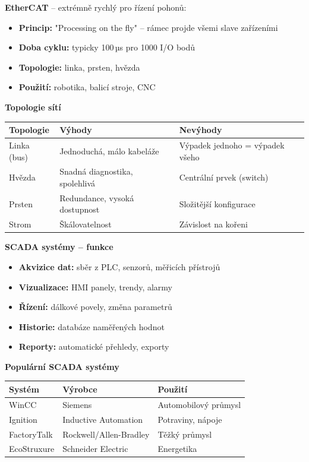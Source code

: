 \documentclass[a4paper,10pt]{article}
\begin{document}
\begin{vysvetlenibox}
\textbf{EtherCAT} -- extrémně rychlý pro řízení pohonů:
\begin{itemize}[noitemsep, leftmargin=1.4em, topsep=4pt]
    \item \textbf{Princip:} "Processing on the fly" -- rámec projde všemi slave zařízeními
    \item \textbf{Doba cyklu:} typicky 100\,µs pro 1000 I/O bodů
    \item \textbf{Topologie:} linka, prsten, hvězda
    \item \textbf{Použití:} robotika, balicí stroje, CNC
\end{itemize}

\textbf{Topologie sítí}
\begin{center}
\begin{tabularx}{0.95\linewidth}{@{} l X X @{}}
    \toprule
    \textbf{Topologie} & \textbf{Výhody} & \textbf{Nevýhody} \\
    \midrule
    Linka (bus) & Jednoduchá, málo kabeláže & Výpadek jednoho = výpadek všeho \\
    Hvězda & Snadná diagnostika, spolehlivá & Centrální prvek (switch) \\
    Prsten & Redundance, vysoká dostupnost & Složitější konfigurace \\
    Strom & Škálovatelnost & Závislost na kořeni \\
    \bottomrule
\end{tabularx}
\end{center}

\textbf{SCADA systémy -- funkce}
\begin{itemize}[noitemsep, leftmargin=1.4em, topsep=4pt]
    \item \textbf{Akvizice dat:} sběr z PLC, senzorů, měřicích přístrojů
    \item \textbf{Vizualizace:} HMI panely, trendy, alarmy
    \item \textbf{Řízení:} dálkové povely, změna parametrů
    \item \textbf{Historie:} databáze naměřených hodnot
    \item \textbf{Reporty:} automatické přehledy, exporty
\end{itemize}

\textbf{Populární SCADA systémy}
\begin{center}
\begin{tabular}{@{} l l l @{}}
    \toprule
    \textbf{Systém} & \textbf{Výrobce} & \textbf{Použití} \\
    \midrule
    WinCC & Siemens & Automobilový průmysl \\
    Ignition & Inductive Automation & Potraviny, nápoje \\
    FactoryTalk & Rockwell/Allen-Bradley & Těžký průmysl \\
    EcoStruxure & Schneider Electric & Energetika \\
    \bottomrule
\end{tabular}
\end{center}
\end{vysvetlenibox}
\end{document}
